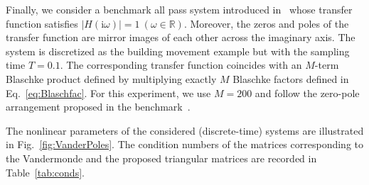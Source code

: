 \documentclass{arxiv}
\newcommand{\ri}{\mathrm{i}}
\newcommand{\R}{\mathbb{R}}
\begin{document}
Finally, we consider a benchmark all pass system introduced in~\cite{morwiki_allpass} whose transfer function satisfies $\left|H(\ri \omega) \right| = 1 \ (\omega \in \R)$. Moreover, the zeros and poles of the transfer function are mirror images of each other across the imaginary axis. The system is discretized as the building movement example but with the sampling time $T=0.1$. The corresponding transfer function coincides with an $M$-term Blaschke product defined by multiplying exactly $M$ Blaschke factors defined in Eq.~\eqref{eq:Blaschfac}. For this experiment, we use $M=200$ and follow the zero-pole arrangement proposed in the benchmark~\cite{morwiki_allpass}.

The nonlinear parameters of the considered (discrete-time) systems are illustrated in Fig.~\ref{fig:VanderPoles}. The condition numbers of the matrices corresponding to the Vandermonde and the proposed triangular matrices are recorded in Table~\ref{tab:conds}.


\end{document}
